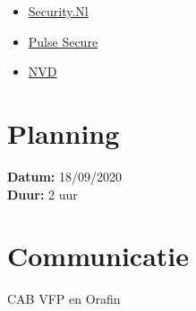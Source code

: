 \documentclass[11pt,]{article}
\begin{document}
\begin{itemize}
\item \href{https://www.security.nl/posting/669116/Beveiligingslek+in+Pulse+Secure+VPN+maakt+uitvoeren+code+mogelijk}{Security.Nl}
\item \href{https://kb.pulsesecure.net/articles/Pulse_Security_Advisories/SA44516}{Pulse Secure}
\item \href{https://nvd.nist.gov/vuln/detail/CVE-2020-8218}{NVD}
\end{itemize}

\hypertarget{Planning}{%
\section{Planning}\label{Planning}}
\textbf {Datum:} 18/09/2020\\
\textbf{Duur:} 2 uur

\hypertarget{Communicatie}{%
\section{Communicatie}\label{Communicatie}}
CAB VFP en Orafin
\end{document}
